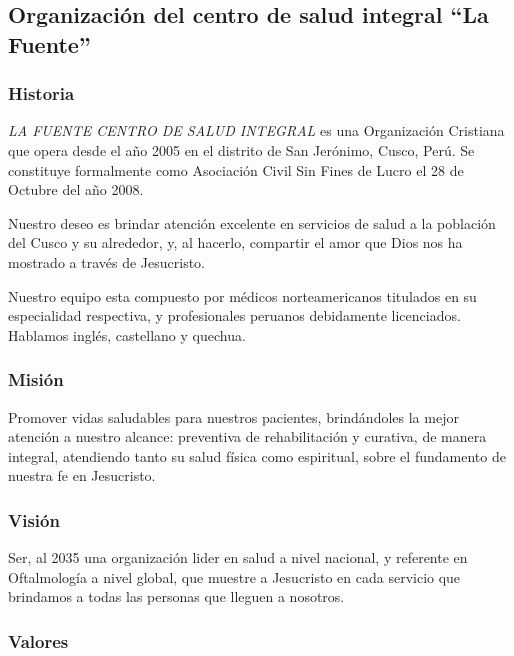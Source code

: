 \subsection{Organización del centro de salud integral ``La Fuente''}

\subsubsection{Historia}
\textsl{LA FUENTE CENTRO DE SALUD INTEGRAL} es una Organización Cristiana que opera desde el año 2005 en el distrito de San Jerónimo, Cusco, Perú. Se constituye formalmente como Asociación Civil Sin Fines de Lucro el 28 de Octubre del año 2008.

Nuestro deseo es brindar atención excelente en servicios de salud a la población del Cusco y su alrededor, y, al hacerlo, compartir el amor que Dios nos ha mostrado a través de Jesucristo.

Nuestro equipo esta compuesto por médicos norteamericanos titulados en su especialidad respectiva, y profesionales peruanos debidamente licenciados. Hablamos inglés, castellano y quechua.

\subsubsection{Misión}
Promover vidas saludables para nuestros pacientes, brindándoles la mejor atención a nuestro alcance: preventiva de rehabilitación y curativa, de manera integral, atendiendo tanto su salud física como espiritual, sobre el fundamento de nuestra fe en Jesucristo.

\subsubsection{Visión}
Ser, al 2035 una organización lider en salud a nivel nacional, y referente en Oftalmología a nivel global, que muestre a Jesucristo en cada servicio que brindamos a todas las personas que lleguen a nosotros.

\subsubsection{Valores}

